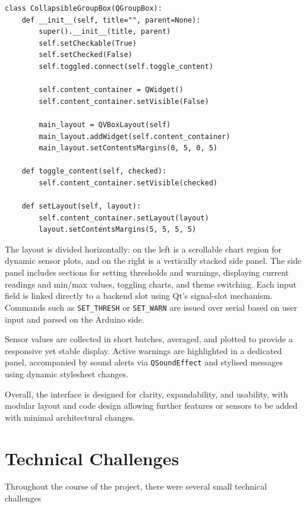 \documentclass[a4paper,11pt]{article}
\begin{document}
\begin{lstlisting}[style=python-style, 
caption={CollapsibleGroupBox class}, label={prog:CGB_class}]
class CollapsibleGroupBox(QGroupBox):
    def __init__(self, title="", parent=None):
        super().__init__(title, parent)
        self.setCheckable(True)
        self.setChecked(False) 
        self.toggled.connect(self.toggle_content)

        self.content_container = QWidget()
        self.content_container.setVisible(False)

        main_layout = QVBoxLayout(self)
        main_layout.addWidget(self.content_container)
        main_layout.setContentsMargins(0, 5, 0, 5)  

    def toggle_content(self, checked):
        self.content_container.setVisible(checked)

    def setLayout(self, layout):
        self.content_container.setLayout(layout)
        layout.setContentsMargins(5, 5, 5, 5)
\end{lstlisting}

The layout is divided horizontally: on the left is a scrollable chart region 
for dynamic sensor plots, and on the right is a vertically stacked side panel. 
The side panel includes sections for setting thresholds and warnings, 
displaying current readings and min/max values, toggling charts,
and theme switching. 
Each input field is linked directly to a backend slot using Qt's signal-slot mechanism. 
Commands such as \texttt{SET\_THRESH} or \texttt{SET\_WARN} 
are issued over serial based on user input and parsed on the Arduino side.

Sensor values are collected in short batches, averaged, 
and plotted to provide a responsive yet stable display. 
Active warnings are highlighted in a dedicated panel, 
accompanied by sound alerts via \texttt{QSoundEffect} 
and stylised messages using dynamic stylesheet changes.

Overall, the interface is designed for clarity, expandability, 
and usability, with modular layout and code design 
allowing further features or sensors to be added with minimal architectural changes.

\section{Technical Challenges}
\label{sec:technical_challenges}

Throughout the course of the project, there were several small technical challenges
\end{document}
